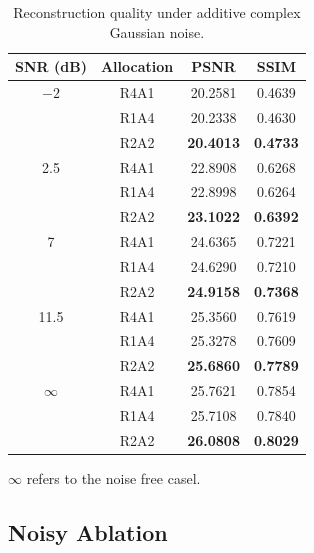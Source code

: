 \documentclass[conference]{IEEEtran}
\begin{document}
\begin{table}[!t]
\caption{Reconstruction quality under additive complex Gaussian noise.}
\label{tab:noise_ablation}
\centering
\scriptsize
\renewcommand{\arraystretch}{0.84}
\setlength{\tabcolsep}{5pt}
\begin{tabular}{c c c c}
\hline
SNR (dB) & Allocation & PSNR & SSIM \\
\hline
$-2$ & R4A1 & 20.2581 & 0.4639 \\
     & R1A4 & 20.2338 & 0.4630 \\
     & R2A2 & \textbf{20.4013} & \textbf{0.4733} \\
\hline
2.5 & R4A1 & 22.8908 & 0.6268 \\
    & R1A4 & 22.8998 & 0.6264 \\
    & R2A2 & \textbf{23.1022} & \textbf{0.6392} \\
\hline
7 & R4A1 & 24.6365 & 0.7221 \\
  & R1A4 & 24.6290 & 0.7210 \\
  & R2A2 & \textbf{24.9158} & \textbf{0.7368} \\
\hline
11.5 & R4A1 & 25.3560 & 0.7619 \\
     & R1A4 & 25.3278 & 0.7609 \\
     & R2A2 & \textbf{25.6860} & \textbf{0.7789} \\
\hline
$\infty$ & R4A1 & 25.7621 & 0.7854 \\
         & R1A4 & 25.7108 & 0.7840 \\
         & R2A2 & \textbf{26.0808} & \textbf{0.8029} \\
\hline
\end{tabular}

\vspace{2pt}
\parbox{0.96\linewidth}{\footnotesize  $\infty$ refers to the noise free casel.}
\end{table}

\subsection{Noisy Ablation}
\end{document}
